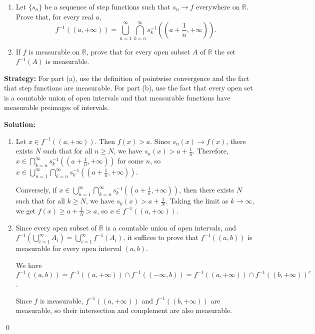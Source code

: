 \begin{problembox}
\begin{enumerate}[label=(\alph*)]
\item Let $\{s_n\}$ be a sequence of step functions such that $s_n \to f$ everywhere on $\mathbb{R}$. Prove that, for every real $a$,
\[f^{-1}((a, +\infty)) = \bigcup_{n=1}^\infty \bigcap_{k=n}^\infty s_k^{-1} \left( \left( a + \frac{1}{n}, +\infty \right) \right).\]
\item If $f$ is measurable on $\mathbb{R}$, prove that for every open subset $A$ of $\mathbb{R}$ the set $f^{-1}(A)$ is measurable.
\end{enumerate}
\end{problembox}

\noindent\textbf{Strategy:} For part (a), use the definition of pointwise convergence and the fact that step functions are measurable. For part (b), use the fact that every open set is a countable union of open intervals and that measurable functions have measurable preimages of intervals.

\bigskip\noindent\textbf{Solution:}
\begin{enumerate}[label=(\alph*)]
\item Let $x \in f^{-1}((a, +\infty))$. Then $f(x) > a$. Since $s_n(x) \to f(x)$, there exists $N$ such that for all $n \geq N$, we have $s_n(x) > a + \frac{1}{n}$. Therefore, $x \in \bigcap_{k=n}^\infty s_k^{-1}((a + \frac{1}{n}, +\infty))$ for some $n$, so $x \in \bigcup_{n=1}^\infty \bigcap_{k=n}^\infty s_k^{-1}((a + \frac{1}{n}, +\infty))$.

Conversely, if $x \in \bigcup_{n=1}^\infty \bigcap_{k=n}^\infty s_k^{-1}((a + \frac{1}{n}, +\infty))$, then there exists $N$ such that for all $k \geq N$, we have $s_k(x) > a + \frac{1}{N}$. Taking the limit as $k \to \infty$, we get $f(x) \geq a + \frac{1}{N} > a$, so $x \in f^{-1}((a, +\infty))$.

\item Since every open subset of $\mathbb{R}$ is a countable union of open intervals, and $f^{-1}(\bigcup_{i=1}^{\infty} A_i) = \bigcup_{i=1}^{\infty} f^{-1}(A_i)$, it suffices to prove that $f^{-1}((a, b))$ is measurable for every open interval $(a, b)$.

We have $f^{-1}((a, b)) = f^{-1}((a, +\infty)) \cap f^{-1}((-\infty, b)) = f^{-1}((a, +\infty)) \cap f^{-1}((b, +\infty))^c$.

Since $f$ is measurable, $f^{-1}((a, +\infty))$ and $f^{-1}((b, +\infty))$ are measurable, so their intersection and complement are also measurable.
\end{enumerate}\qed


